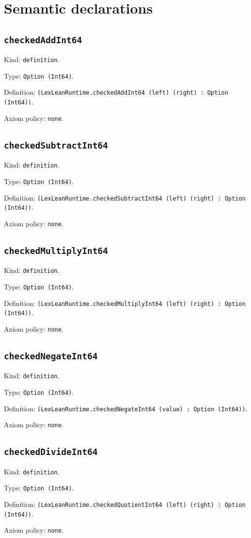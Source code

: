 \documentclass[11pt]{article}
\begin{document}
\section*{Semantic declarations}
\subsection*{\texttt{checkedAddInt64}}
\noindent Kind: \texttt{definition}.\par
\noindent Type: \texttt{Option (Int64)}.\par
\noindent Definition: \texttt{(LexLeanRuntime.checkedAddInt64 (left) (right) : Option (Int64))}.\par
\noindent Axiom policy: \texttt{none}.\par
\subsection*{\texttt{checkedSubtractInt64}}
\noindent Kind: \texttt{definition}.\par
\noindent Type: \texttt{Option (Int64)}.\par
\noindent Definition: \texttt{(LexLeanRuntime.checkedSubtractInt64 (left) (right) : Option (Int64))}.\par
\noindent Axiom policy: \texttt{none}.\par
\subsection*{\texttt{checkedMultiplyInt64}}
\noindent Kind: \texttt{definition}.\par
\noindent Type: \texttt{Option (Int64)}.\par
\noindent Definition: \texttt{(LexLeanRuntime.checkedMultiplyInt64 (left) (right) : Option (Int64))}.\par
\noindent Axiom policy: \texttt{none}.\par
\subsection*{\texttt{checkedNegateInt64}}
\noindent Kind: \texttt{definition}.\par
\noindent Type: \texttt{Option (Int64)}.\par
\noindent Definition: \texttt{(LexLeanRuntime.checkedNegateInt64 (value) : Option (Int64))}.\par
\noindent Axiom policy: \texttt{none}.\par
\subsection*{\texttt{checkedDivideInt64}}
\noindent Kind: \texttt{definition}.\par
\noindent Type: \texttt{Option (Int64)}.\par
\noindent Definition: \texttt{(LexLeanRuntime.checkedQuotientInt64 (left) (right) : Option (Int64))}.\par
\noindent Axiom policy: \texttt{none}.\par
\end{document}
